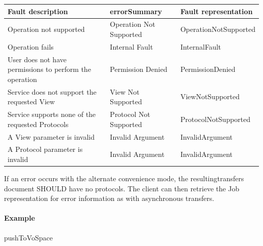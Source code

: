 \documentclass[11pt,a4paper]{ivoa}
\begin{document}
\vspace{3mm}
\begin{tabular}{ p{5cm} l p{4cm} }
\textbf{Fault description} & \textbf{errorSummary} & \textbf{Fault representation} \\
\hline
Operation not supported & Operation Not Supported & OperationNotSupported \\
\hline
Operation fails & Internal Fault & InternalFault \\
\hline
User does not have permissions to perform the operation	 & Permission Denied & PermissionDenied \\
\hline
Service does not support the requested View & View Not Supported & ViewNotSupported \\
\hline
Service supports none of the requested Protocols & Protocol Not Supported &ProtocolNotSupported \\
\hline
A View parameter is invalid & Invalid Argument & InvalidArgument \\
\hline
A Protocol parameter is invalid & Invalid Argument & InvalidArgument \\
\hline
\end{tabular}
\vspace{3mm}

If an error occurs with the alternate convenience mode, the resultingtransfers document SHOULD have no protocols. The client can then retrieve the Job representation for error information as with asynchronous transfers.

\paragraph{Example}
pushToVoSpace
\end{document}
